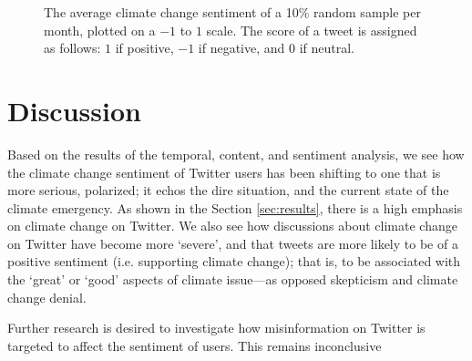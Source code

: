 \documentclass{paper}
\begin{document}
\begin{figure}[!t]
    \centering
    \caption{The average climate change sentiment of a 10\% random sample per month, plotted on a $-1$ to $1$ scale. The score of a tweet is assigned as follows: $1$ if positive, $-1$ if negative, and $0$ if neutral.}
    \label{fig:sentiment_over_time}
\end{figure}

\section{Discussion}
Based on the results of the temporal, content, and sentiment analysis, we see how the climate change sentiment of Twitter users has been shifting to one that is more serious, polarized; it echos the dire situation, and the current state of the climate emergency. As shown in the Section \ref{sec:results}, there is a high emphasis on climate change on Twitter. We also see how discussions about climate change on Twitter have become more `severe', and that tweets are more likely to be of a positive sentiment (i.e. supporting climate change); that is, to be associated with the `great' or `good' aspects of climate issue---as opposed skepticism and climate change denial. 

Further research is desired to investigate how misinformation on Twitter is targeted to affect the sentiment of users. This remains inconclusive

\FloatBarrier
\clearpage
\printbibliography[]
\end{document}

